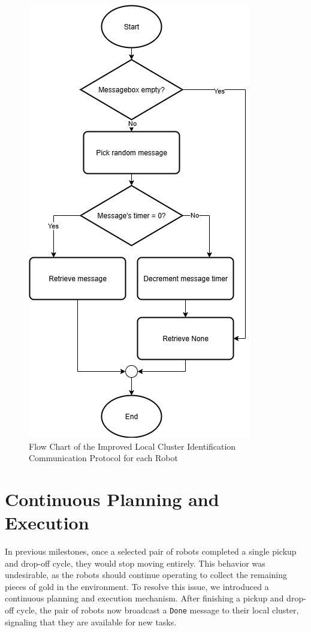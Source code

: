 \documentclass[12pt,a4paper]{article}
\begin{document}
\begin{figure}
    \centering
    \includegraphics[width=0.6\linewidth]{images/message_flow.png}
    \caption{Flow Chart of the Improved Local Cluster Identification Communication Protocol for each Robot}   
    \label{fig:msg-flowchart}
\end{figure}

\section{Continuous Planning and Execution}
In previous milestones, once a selected pair of robots completed a single pickup and drop-off cycle, they would stop moving entirely. This behavior was undesirable, as the robots should continue operating to collect the remaining pieces of gold in the environment. To resolve this issue, we introduced a continuous planning and execution mechanism. After finishing a pickup and drop-off cycle, the pair of robots now broadcast a \texttt{Done} message to their local cluster, signaling that they are available for new tasks.
\end{document}
